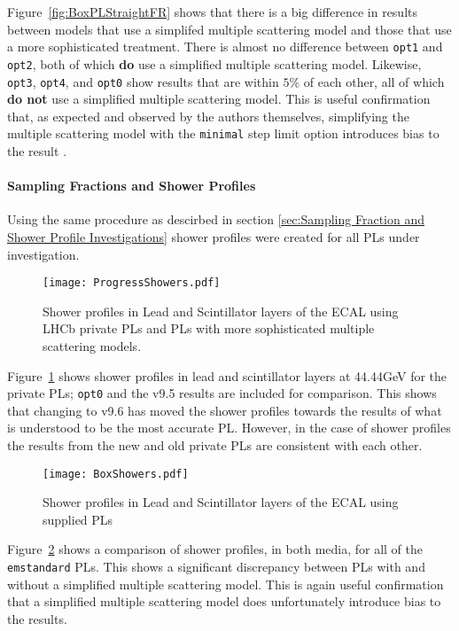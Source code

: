 Figure~\ref{fig:BoxPLStraightFR} shows that there is a big difference in results between models that use a simplifed multiple scattering model and those that use a more sophisticated treatment. There is almost no difference between \texttt{opt1} and \texttt{opt2}, both of which \textbf{do} use a simplified multiple scattering model.  Likewise, \texttt{opt3}, \texttt{opt4}, and \texttt{opt0} show results that are within $5\%$ of each other, all of which \textbf{do not} use a simplified multiple scattering model.  This is useful confirmation that, as expected and observed by the \geant authors themselves, simplifying the multiple scattering model with the \texttt{minimal} step limit option introduces bias to the result \cite{1742-6596-219-3-032045}.

\paragraph{Sampling Fractions and Shower Profiles} 
Using the same procedure as descirbed in section \ref{sec:Sampling Fraction and Shower Profile Investigations} shower profiles were created for all PLs under investigation.  
\begin{figure}[h]
  \centering
  \texttt{[image: ProgressShowers.pdf]}
  \caption{Shower profiles in Lead and Scintillator layers of the ECAL using LHCb private PLs and \geant PLs with more sophisticated multiple scattering models.}
  \label{fig:LHCbPLShowers}
\end{figure}

Figure~\ref{fig:LHCbPLShowers} shows shower profiles in lead and scintillator layers at 44.44GeV for the \lhcb private PLs; \texttt{opt0} and the v9.5 results are included for comparison.  This shows that changing to \geant v9.6 has moved the shower profiles towards the results of what is understood to be the most accurate PL.  However, in the case of shower profiles the results from the new and old \lhcb private PLs are consistent with each other.

\begin{figure}[h]
  \centering
  \texttt{[image: BoxShowers.pdf]}
  \caption{Shower profiles in Lead and Scintillator layers of the ECAL using \geant supplied PLs}
  \label{fig:BoxPLShowers}
\end{figure}

Figure~\ref{fig:BoxPLShowers} shows a comparison of shower profiles, in both media, for all of the \texttt{emstandard} PLs.  This shows a significant discrepancy between PLs with and without a simplified multiple scattering model.  This is again useful confirmation that a simplified multiple scattering model does unfortunately introduce bias to the results.


